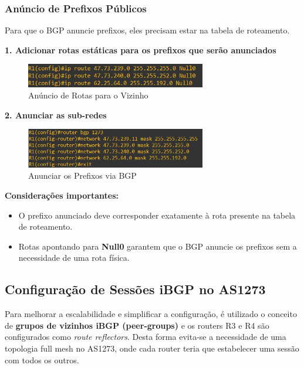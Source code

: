\documentclass[11pt,english, openright, oneside]{book}
\begin{document}
\pagebreak
\subsubsection{Anúncio de Prefixos Públicos} \par
\vspace{0.2cm}
Para que o BGP anuncie prefixos, eles precisam estar na tabela de roteamento.
\par \vspace{0.4cm}

\hspace{0.8cm} \textbf{1. Adicionar rotas estáticas para os prefixos que serão anunciados } \par
\begin{figure}[H]
  \centering
  \includegraphics[width=0.70\textwidth]{imagens/Tarefa2/2.png}
  \caption{Anúncio de Rotas para o Vizinho}
  \label{fig:anuncioRotas}
\end{figure} \vspace{0.2cm}

\hspace{0.8cm} \textbf{2. Anunciar as sub-redes} \par
\begin{figure}[H]
  \centering
  \includegraphics[width=0.70\textwidth]{imagens/Tarefa2/3.png}
  \caption{Anunciar os Prefixos via BGP}
  \label{fig:anunciarPrefixos}
\end{figure}
\vspace{0.4cm}

\textbf{Considerações importantes:}
\begin{itemize}
  \item O prefixo anunciado deve corresponder exatamente à rota presente na tabela de roteamento.
  \item Rotas apontando para \textbf{Null0} garantem que o BGP anuncie os prefixos sem a necessidade de uma rota física.
\end{itemize}


\pagebreak
\subsection{Configuração de Sessões iBGP no AS1273}
Para melhorar a escalabilidade e simplificar a configuração, é utilizado o conceito de \textbf{grupos de vizinhos iBGP (peer-groups)} e os routers R3 e R4 são configurados como \textit{route reflectors}. Desta forma evita-se a necessidade de uma topologia full mesh no AS1273, onde cada router teria que estabelecer uma sessão com todos os outros. \par \vspace{0.4cm}
\end{document}
